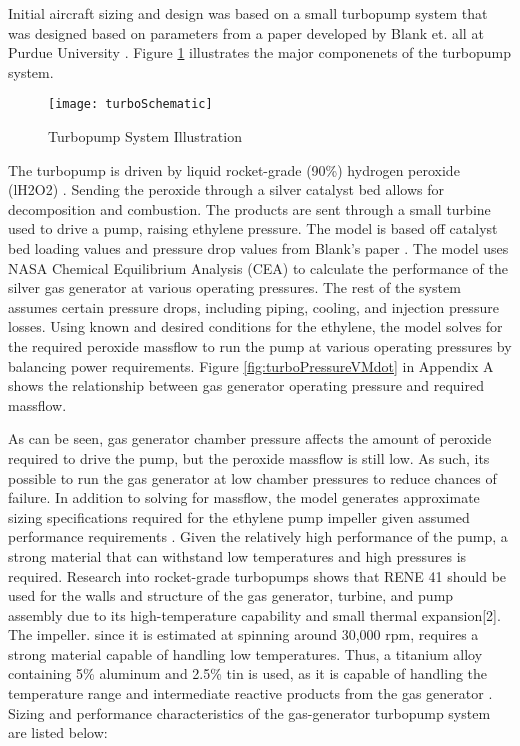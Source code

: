 Initial aircraft sizing and design was based on a small turbopump system that was designed based on parameters from a paper developed by Blank et. all at Purdue University \cite{catalyst}. Figure \ref{fig:turboSchematic} illustrates the major componenets of the turbopump system.

\begin{figure}[H]
\texttt{[image: turboSchematic]}
\caption{Turbopump System Illustration}
\label{fig:turboSchematic}
\end{figure}
 
The turbopump is driven by liquid rocket-grade (90\%) hydrogen peroxide (lH2O2) . Sending the peroxide through a silver catalyst bed allows for decomposition and combustion. The products are sent through a small turbine used to drive a pump, raising ethylene pressure. The model is based off catalyst bed loading values and pressure drop values from Blank’s paper \cite{catalyst}. The model uses NASA Chemical Equilibrium Analysis (CEA) to calculate the performance of the silver gas generator at various operating pressures. The rest of the system assumes certain pressure drops, including piping, cooling, and injection pressure losses. Using known and desired conditions for the ethylene, the model solves for the required peroxide massflow to run the pump at various operating pressures by balancing power requirements. Figure \ref{fig:turboPressureVMdot} in Appendix A shows the relationship between gas generator operating pressure and required massflow. 

As can be seen, gas generator chamber pressure affects the amount of peroxide required to drive the pump, but the peroxide massflow is still low. As such, its possible to run the gas generator at low chamber pressures to reduce chances of failure. In addition to solving for massflow, the model generates approximate sizing specifications required for the ethylene pump impeller given assumed performance requirements \cite{sutton}. Given the relatively high performance of the pump, a strong material that can withstand low temperatures and high pressures is required. Research into rocket-grade turbopumps \cite{turbo} shows that RENE 41 should be used for the walls and structure of the gas generator, turbine, and pump assembly due to its high-temperature capability and small thermal expansion[2]. The impeller. since it is estimated at spinning around 30,000 rpm, requires a strong material capable of handling low temperatures. Thus, a titanium alloy containing 5\% aluminum and 2.5\% tin is used, as it is capable of handling the temperature range and intermediate reactive products from the gas generator \cite{sutton}. Sizing and performance characteristics of the gas-generator turbopump system are listed below: 


